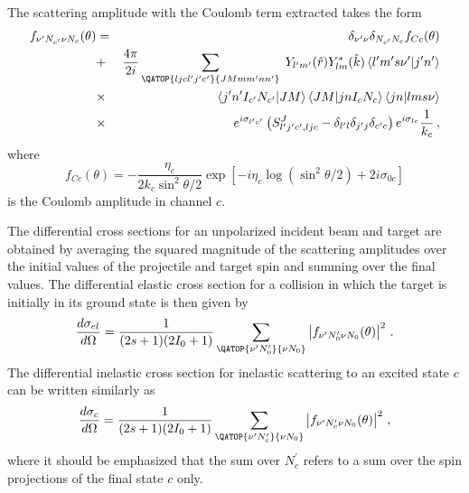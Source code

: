 The scattering amplitude with the Coulomb term extracted takes the form
\begin{eqnarray}
f_{\nu^{\prime}N_{c^{\prime}}\nu N_{c}}(\theta) & = &
\delta_{\nu^{\prime}\nu}\delta_{N_{c^{\prime}}N_{c}}f_{Cc}(\theta) \\
& + & \frac{4\pi}{2i}\sum_{{{\QATOP{ljcl^{\prime}j^{\prime}c^{\prime}}{%
JMmm^{\prime}nn^{\prime}}}}}\; Y_{l^{\prime}m^{\prime}}(\hat{r})Y_{lm}^{*}(%
\hat{k})\left\langle
l^{\prime}m^{\prime}s\nu^{\prime}|j^{\prime}n^{\prime}\right\rangle  \notag
\\
& \times &\left\langle
j^{\prime}n^{\prime}I_{c^{\prime}}N_{c^{\prime}}|JM\right\rangle
\left\langle JM|jnI_{c}N_{c}\right\rangle \left\langle jn|lms\nu\right\rangle
\notag \\
&\times &
e^{i\sigma_{l^{\prime}c^{\prime}}}\left(S_{l^{\prime}j^{\prime}c^{%
\prime},ljc}^{J}-\delta_{l^{\prime}l}\delta_{j^{\prime}j}\delta_{c^{%
\prime}c}\right)e^{i\sigma_{lc}}\frac{1}{k_{c}}\,,  \notag
\end{eqnarray}
where
\begin{equation}
f_{Cc}(\theta)=-\frac{\eta_{c}}{2k_{c}\sin^{2}\theta/2}\exp\left[%
-i\eta_{c}\log\left(\sin^{2}\theta/2\right)+2i\sigma_{0c}\right]
\end{equation}
is the Coulomb amplitude in channel $c$.

The differential cross sections for an unpolarized incident beam and target
are obtained by averaging the squared magnitude of the scattering amplitudes
over the initial values of the projectile and target spin and summing over
the final values. The differential elastic cross section for a collision in
which the target is initially in its ground state is then given by
\begin{equation}
\frac{d\sigma_{el}}{d\Omega}=\frac{1}{(2s+1)(2I_{0}+1)}\sum_{{{\QATOP{%
\nu^{\prime}N_{0}^{\prime}}{\nu N_{0}}}}}\left|f_{\nu^{\prime}N_{0}^{\prime}%
\nu N_{0}}(\theta)\right|^{2}\,.  \label{celf}
\end{equation}
The differential inelastic cross section for inelastic scattering to an
excited state $c$ can be written similarly as
\begin{equation}
\frac{d\sigma_{c}}{d\Omega}=\frac{1}{(2s+1)(2I_{0}+1)}\sum_{{{\QATOP{%
\nu^{\prime}N_{c}^{\prime}}{\nu N_{0}}}}}\left|f_{\nu^{\prime}N_{c}^{\prime}%
\nu N_{0}}(\theta)\right|^{2}\,,
\end{equation}
where it should be emphasized that the sum over $N_{c}^{\prime}$ refers to a
sum over the spin projections of the final state $c$ only.

